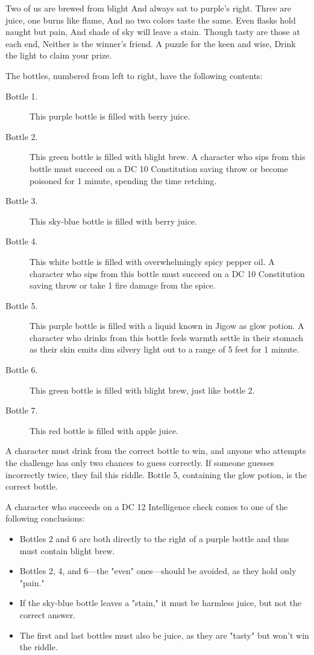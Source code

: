 \documentclass[10pt,a4paper,twoside,fancy,bg=print,twocolumn,openany,nodeprecatedcode]{dndbook}
\begin{document}
\begin{DndReadAloud}{}
Two of us are brewed from blight And always sat to purple's right. Three are juice, one burns like flame, And no two colors taste the same. Even flasks hold naught but pain, And shade of sky will leave a stain. Though tasty are those at each end, Neither is the winner's friend. A puzzle for the keen and wise, Drink the light to claim your prize.

\end{DndReadAloud}

The bottles, numbered from left to right, have the following contents:


\begin{description}
\item[Bottle 1.]
This purple bottle is filled with berry juice.
\item[Bottle 2.]
This green bottle is filled with blight brew. A character who sips from this bottle must succeed on a DC 10 Constitution saving throw or become poisoned for 1 minute, spending the time retching.
\item[Bottle 3.]
This sky-blue bottle is filled with berry juice.
\item[Bottle 4.]
This white bottle is filled with overwhelmingly spicy pepper oil. A character who sips from this bottle must succeed on a DC 10 Constitution saving throw or take 1 fire damage from the spice.
\item[Bottle 5.]
This purple bottle is filled with a liquid known in Jigow as glow potion. A character who drinks from this bottle feels warmth settle in their stomach as their skin emits dim silvery light out to a range of 5 feet for 1 minute.
\item[Bottle 6.]
This green bottle is filled with blight brew, just like bottle 2.
\item[Bottle 7.]
This red bottle is filled with apple juice.
\end{description}

A character must drink from the correct bottle to win, and anyone who attempts the challenge has only two chances to guess correctly. If someone guesses incorrectly twice, they fail this riddle. Bottle 5, containing the glow potion, is the correct bottle.

A character who succeeds on a DC 12 Intelligence check comes to one of the following conclusions:


\begin{itemize}
\item Bottles 2 and 6 are both directly to the right of a purple bottle and thus must contain blight brew.
\item Bottles 2, 4, and 6—the "even" ones—should be avoided, as they hold only "pain."
\item If the sky-blue bottle leaves a "stain," it must be harmless juice, but not the correct answer.
\item The first and last bottles must also be juice, as they are "tasty" but won't win the riddle.
\end{itemize}
\end{document}
